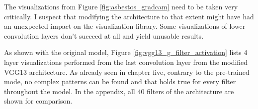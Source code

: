 \begin{figure}[!h]
{}
\label{fig:asbestos_gradcam_g}
\end{figure}

The visualizations from Figure \ref{fig:asbestos_gradcam} need to be taken very critically. I suspect that modifying the architecture to that extent might have had an unexpected impact on the visualization library. Some visualizations of lower convolution layers don't succeed at all and yield unusable results.

As shown with the original model, Figure \ref{fig:vgg13_g_filter_activation} lists 4 layer visualizations performed from the last convolution layer from the modified VGG13 architecture. As already seen in chapter five, contrary to the pre-trained mode, no complex patterns can be found and that holds true for every filter throughout the model. In the appendix, all 40 filters of the architecture are shown for comparison.

